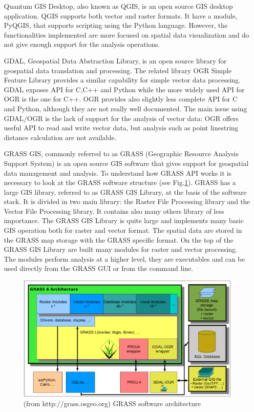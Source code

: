 \documentclass[12pt,a4paper,twoside]{book}
\begin{document}
Quantum GIS Desktop, also known as QGIS, is an open source GIS desktop application. QGIS supports both vector and raster formats. It have a module, PyQGIS, that supports scripting using the Python language. However, the functionalities implemented are more focused on spatial data visualization and do not give enough support for the analysis operations.

GDAL, Geospatial Data Abstraction Library, is an open source library for geospatial data translation and processing. The related library OGR Simple Feature Library provides a similar capability for simple vector data processing. GDAL exposes API for C,C++ and Python while the more widely used API for OGR is the one for C++. OGR provides also slightly less complete API for C and Python, although they are not really well documented. The main issue using GDAL/OGR is the lack of support for the analysis of vector data: OGR offers useful API to read and write vector data, but analysis such as point linestring distance calculation are not available.

GRASS GIS, commonly referred to as GRASS (Geographic Resource Analysis Support System) is an open source GIS software that gives support for geospatial data management and analysis. To understand how GRASS API works it is necessary to look at the GRASS software structure (see Fig.\ref{grass_structure}). GRASS has a large GIS library, referred to as GRASS GIS Library, at the basis of the software stack. It is divided in two main library: the Raster File Processing library and the Vector File Processing library. It contains also many others library of less importance. The GRASS GIS Library is quite large and implements many basic GIS operation both for raster and vector format. The spatial data are stored in the GRASS map storage with the GRASS specific format. On the top of the GRASS GIS Library are built many modules for raster and vector processing. The modules perform analysis at a higher level, they are executables and can be used directly from the GRASS GUI or from the command line.

\begin{figure}
  \begin{center}
    \includegraphics[width=\textwidth]{images/grass6_arch.eps}
    \caption{(from http://grass.osgeo.org) GRASS software architecture}\label{grass_structure}
  \end{center}
\end{figure}
\end{document}
